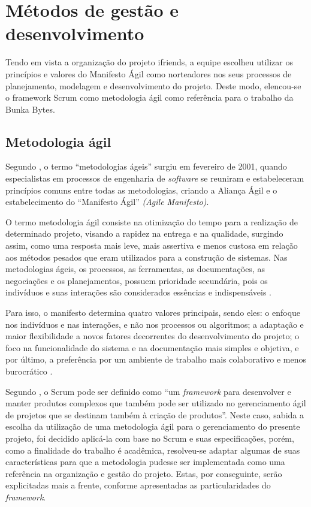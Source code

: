 \section{Métodos de gestão e desenvolvimento}
\label{metodologia agil}
Tendo em vista a organização do projeto \gls{ifriends}, a equipe escolheu utilizar os princípios e valores do Manifesto Ágil como norteadores nos seus processos de planejamento, modelagem e desenvolvimento do projeto. Deste modo, elencou-se  o \gls{framework} Scrum como metodologia ágil como referência para o trabalho da Bunka Bytes.

\subsection{Metodologia ágil}
Segundo , o termo “metodologias ágeis” surgiu em fevereiro de 2001, quando  especialistas em processos de engenharia de \textsl{software} se reuniram e estabeleceram princípios comuns entre todas as metodologias, criando a Aliança Ágil e o estabelecimento do ``Manifesto Ágil'' \textsl{(Agile Manifesto)}.

O termo metodologia ágil consiste na otimização do tempo para a realização de determinado projeto, visando a rapidez na entrega e na qualidade, surgindo assim, como uma resposta mais leve, mais assertiva e menos custosa em relação aos métodos pesados que eram utilizados para a construção de sistemas. Nas metodologias ágeis, os processos, as ferramentas, as documentações, as negociações e os planejamentos, possuem prioridade secundária, pois os indivíduos e suas interações são considerados essências e indispensáveis \cite{sganderla2016aprimorando}.

Para isso, o manifesto determina quatro valores principais, sendo eles: o enfoque nos indivíduos e nas interações, e não nos processos ou algoritmos; a adaptação e maior flexibilidade a novos fatores decorrentes do desenvolvimento do projeto; o foco na funcionalidade do sistema e na documentação mais simples e objetiva, e por último, a preferência por um ambiente de trabalho mais colaborativo e menos burocrático  \cite{sganderla2016aprimorando}. 

Segundo , o Scrum pode ser definido como ``um \textsl{\gls{framework}} para desenvolver e manter produtos complexos que também pode ser utilizado no gerenciamento ágil de projetos que se destinam também à criação de produtos''. Neste caso, sabida a escolha da utilização de uma metodologia ágil para o gerenciamento do presente projeto, foi decidido aplicá-la com base no Scrum e suas especificações, porém, como a finalidade do trabalho é acadêmica, resolveu-se adaptar algumas de suas características para que a metodologia pudesse ser implementada como uma referência na organização e gestão do projeto. Estas, por conseguinte, serão explicitadas mais a frente, conforme apresentadas as particularidades do \textsl{\gls{framework}}.

